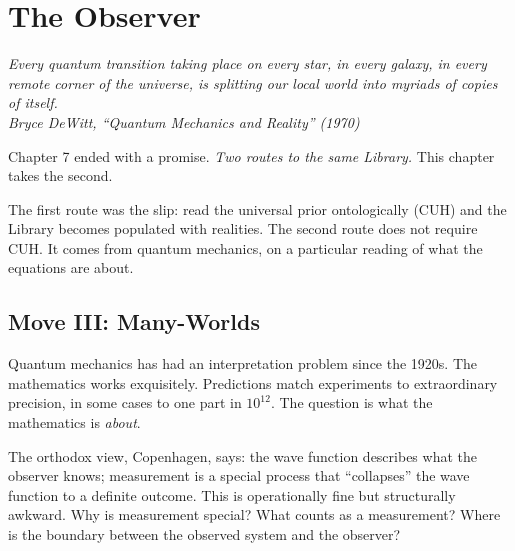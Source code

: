 \chapter{The Observer}

\vspace{1em}
\hfill
\begin{minipage}[c]{0.55\textwidth}
\raggedleft
\small\itshape
Every quantum transition taking place on every star, in every galaxy, in every remote corner of the universe, is splitting our local world into myriads of copies of itself.\\[0.5em]
\upshape\footnotesize Bryce DeWitt, ``Quantum Mechanics and Reality'' (1970)
\end{minipage}%
\hspace{0.5em}
\begin{minipage}[c]{0.12\textwidth}
\end{minipage}
\vspace{1.5em}

\noindent Chapter 7 ended with a promise. \emph{Two routes to the same Library.} This chapter takes the second.

The first route was the slip: read the universal prior ontologically (CUH) and the Library becomes populated with realities. The second route does not require CUH. It comes from quantum mechanics, on a particular reading of what the equations are about.

\section*{Move III: Many-Worlds}

Quantum mechanics has had an interpretation problem since the 1920s. The mathematics works exquisitely. Predictions match experiments to extraordinary precision, in some cases to one part in $10^{12}$. The question is what the mathematics is \emph{about}.

The orthodox view, Copenhagen, says: the wave function describes what the observer knows; measurement is a special process that ``collapses'' the wave function to a definite outcome. This is operationally fine but structurally awkward. Why is measurement special? What counts as a measurement? Where is the boundary between the observed system and the observer?

